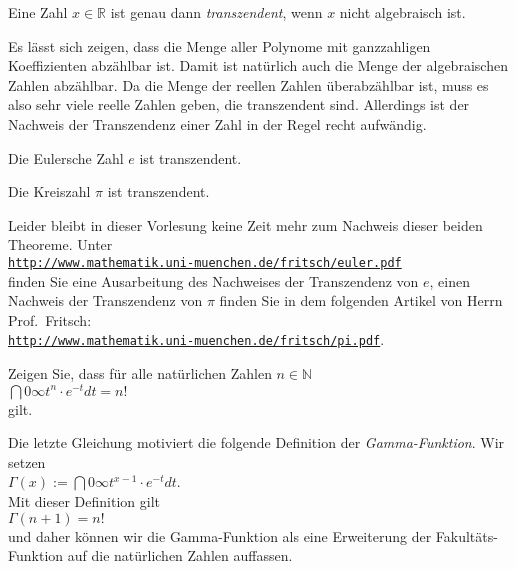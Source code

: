 \begin{Definition}
  Eine Zahl $x \in \mathbb{R}$ ist genau dann \emph{transzendent}, wenn $x$ nicht algebraisch ist.
\end{Definition}

Es l\"asst sich zeigen, dass die Menge aller Polynome mit ganzzahligen Koeffizienten abz\"ahlbar ist.  Damit
ist nat\"urlich auch die Menge der algebraischen Zahlen abz\"ahlbar.  Da die Menge der reellen Zahlen
\"uberabz\"ahlbar ist, muss es also sehr viele reelle Zahlen geben, die transzendent sind.  Allerdings ist
der Nachweis der Transzendenz einer Zahl in der Regel recht aufw\"andig.  

\begin{Theorem} \lb
  Die Eulersche Zahl $e$ ist transzendent.
\end{Theorem}

\begin{Theorem} \lb
  Die Kreiszahl $\pi$ ist transzendent.
\end{Theorem}
\pagebreak

\noindent
Leider bleibt in dieser Vorlesung keine Zeit mehr zum Nachweis dieser beiden Theoreme.  Unter
\\[0.2cm]
\hspace*{1.3cm}
\href{http://www.mathematik.uni-muenchen.de/~fritsch/euler.pdf}{\texttt{http://www.mathematik.uni-muenchen.de/fritsch/euler.pdf}}
\\[0.2cm]
finden Sie eine Ausarbeitung des Nachweises der Transzendenz von $e$, einen Nachweis der Transzendenz
von $\pi$ finden Sie in dem folgenden Artikel von Herrn Prof.~Fritsch:
\\[0.2cm]
\hspace*{1.3cm}
\href{http://www.mathematik.uni-muenchen.de/~fritsch/pi.pdf}{\texttt{http://www.mathematik.uni-muenchen.de/fritsch/pi.pdf}}.

\exercises 
Zeigen Sie, dass f\"ur alle nat\"urlichen Zahlen $n \in \mathbb{N}$
\\[0.2cm]
\hspace*{1.3cm}
$\dint{0}{\infty} t^n \cdot e^{-t} dt = n!$
\\[0.2cm]
gilt. \eox

\remark
Die letzte Gleichung motiviert die folgende Definition der
\emph{Gamma-Funktion}.  Wir setzen
\\[0.2cm]
\hspace*{1.3cm}
$\Gamma(x) := \dint{0}{\infty} t^{x-1} \cdot e^{-t} dt$.
\\[0.2cm]
Mit dieser Definition gilt
\\[0.2cm]
\hspace*{1.3cm}
$\Gamma(n+1) = n!$
\\[0.2cm]
und daher k\"onnen wir die Gamma-Funktion als eine Erweiterung der Fakult\"ats-Funktion auf
die nat\"urlichen Zahlen {auf}fassen.

